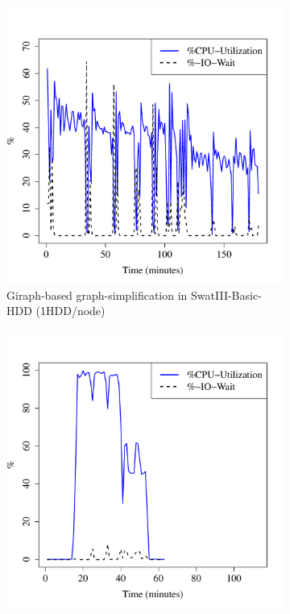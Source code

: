\documentclass[conference]{IEEEtran}
\begin{document}
\begin{figure}[htb]
\begin{subfigure}[b]{0.23\textwidth}
                \includegraphics[width=\textwidth]{Figure/SystemData/Plots/ECCPUHDD.pdf}
                \caption{Giraph-based graph-simplification in SwatIII-Basic-HDD (1HDD/node)}
                \label{fig:ECCPUHDD}
        \end{subfigure} 
        \begin{subfigure}[b]{0.23\textwidth}
                \includegraphics[width=\textwidth]{Figure/SystemData/Plots/BGCPUSSD.pdf}

\end{subfigure}
\end{figure}
\end{document}
